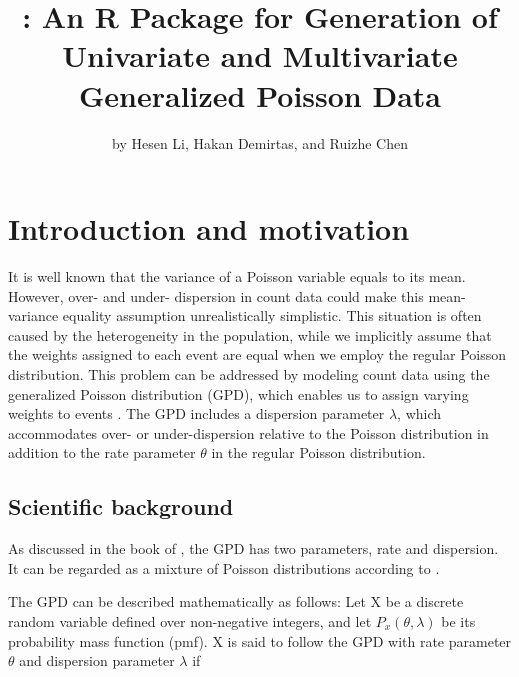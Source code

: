 \title{: An R Package for Generation of Univariate and Multivariate Generalized Poisson Data}
\author{by Hesen Li, Hakan Demirtas, and Ruizhe Chen}

\maketitle


\section{Introduction and motivation}

It is well known that the variance of a Poisson variable equals to its mean. However, over- and under- dispersion in count data could make this mean-variance equality assumption unrealistically simplistic. This situation is often caused by the heterogeneity in the population, while we implicitly assume that the weights assigned to each event are equal when we employ the regular Poisson distribution. This problem can be addressed by modeling count data using the generalized Poisson distribution (GPD), which enables us to assign varying weights to events \citep{satterthwaite}. The GPD includes a dispersion parameter $\lambda$, which accommodates over- or under-dispersion relative to the Poisson distribution in addition to the rate parameter $\theta$ in the regular Poisson distribution.

\subsection{Scientific background} 

As discussed in the book of \cite{consul1989generalized}, the GPD has two parameters, rate and dispersion. It can be regarded as a mixture of Poisson distributions according to \cite{joe}. 

The GPD can be described mathematically as follows: Let X be a discrete random variable defined over non-negative integers, and let $P_{x}(\theta, \lambda)$ be its probability mass function (pmf). X is said to follow the GPD with rate parameter $\theta$ and dispersion parameter $\lambda$ if 

